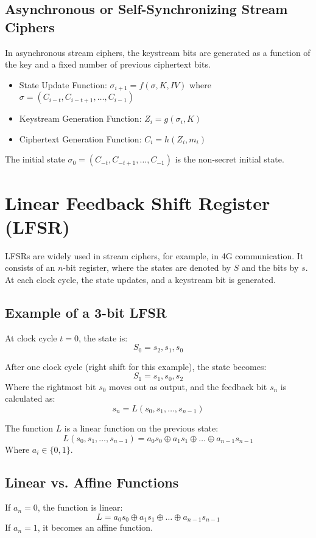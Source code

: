 \documentclass{article}
\begin{document}
\subsection{Asynchronous or Self-Synchronizing Stream Ciphers}
In asynchronous stream ciphers, the keystream bits are generated as a function of the key and a fixed number of previous ciphertext bits.

\begin{itemize}
    \item State Update Function: $\sigma_{i+1} = f(\sigma, K, IV)$ where $\sigma = (C_{i-t}, C_{i-t+1}, \dots, C_{i-1})$
    \item Keystream Generation Function: $Z_i = g(\sigma_i, K)$
    \item Ciphertext Generation Function: $C_i = h(Z_i, m_i)$
\end{itemize}

The initial state $\sigma_0 = (C_{-t}, C_{-t+1}, \dots, C_{-1})$ is the non-secret initial state.

\section{Linear Feedback Shift Register (LFSR)}
LFSRs are widely used in stream ciphers, for example, in 4G communication. It consists of an $n$-bit register, where the states are denoted by $S$ and the bits by $s$. At each clock cycle, the state updates, and a keystream bit is generated.

\subsection{Example of a 3-bit LFSR}
At clock cycle $t = 0$, the state is:
\[
S_0 = s_2, s_1, s_0
\]

After one clock cycle (right shift for this example), the state becomes:
\[
S_1 = s_1, s_0, s_2
\]
Where the rightmost bit $s_0$ moves out as output, and the feedback bit $s_n$ is calculated as:
\[
s_n = L(s_0, s_1, \dots, s_{n-1})
\]

The function $L$ is a linear function on the previous state:
\[
L(s_0, s_1, \dots, s_{n-1}) = a_0 s_0 \oplus a_1 s_1 \oplus \dots \oplus a_{n-1} s_{n-1}
\]
Where $a_i \in \{0, 1\}$.

\subsection{Linear vs. Affine Functions}
If $a_n = 0$, the function is linear:
\[
L = a_0 s_0 \oplus a_1 s_1 \oplus \dots \oplus a_{n-1} s_{n-1}
\]
If $a_n = 1$, it becomes an affine function.
\end{document}
